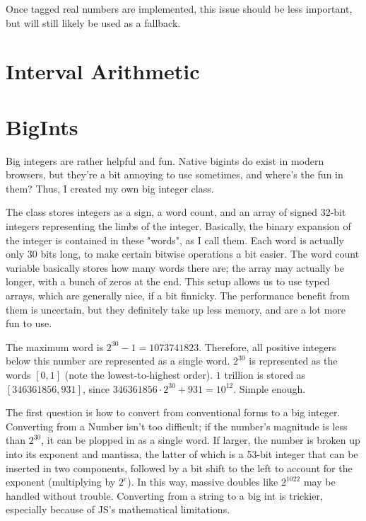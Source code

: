 \documentclass{article}
\begin{document}
Once tagged real numbers are implemented, this issue should be less important, but will still likely be used as a fallback.

\section{Interval Arithmetic}

\section{BigInts}

Big integers are rather helpful and fun. Native bigints do exist in modern browsers, but they're a bit annoying to use sometimes, and where's the fun in them? Thus, I created my own big integer class.

The class stores integers as a sign, a word count, and an array of signed 32-bit integers representing the limbs of the integer. Basically, the binary expansion of the integer is contained in these "words", as I call them. Each word is actually only 30 bits long, to make certain bitwise operations a bit easier. The word count variable basically stores how many words there are; the array may actually be longer, with a bunch of zeros at the end. This setup allows us to use typed arrays, which are generally nice, if a bit finnicky. The performance benefit from them is uncertain, but they definitely take up less memory, and are a lot more fun to use.

The maximum word is $2^{30}-1 = 1073741823$. Therefore, all positive integers below this number are represented as a single word. $2^{30}$ is represented as the words $[0, 1]$ (note the lowest-to-highest order). $1$ trillion is stored as $[346361856, 931]$, since $346361856\cdot 2^{30} + 931 = 10^{12}$. Simple enough.

The first question is how to convert from conventional forms to a big integer. Converting from a Number isn't too difficult; if the number's magnitude is less than $2^30$, it can be plopped in as a single word. If larger, the number is broken up into its exponent and mantissa, the latter of which is a 53-bit integer that can be inserted in two components, followed by a bit shift to the left to account for the exponent (multiplying by $2^e$). In this way, massive doubles like $2^{1022}$ may be handled without trouble. Converting from a string to a big int is trickier, especially because of JS's mathematical limitations.
\end{document}
